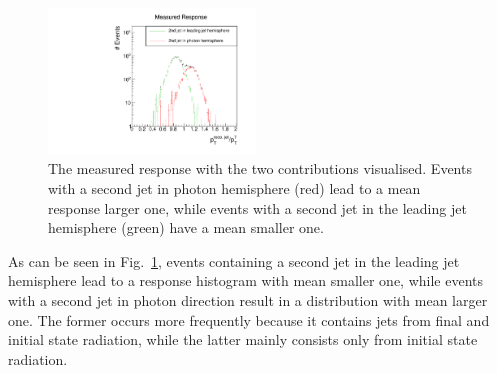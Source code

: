 \begin{figure}[!b]
  \centering
  \vspace{35pt}
      \includegraphics[width=0.49\textwidth]{figures/resolution/methodology/fullResponseAndContributionsExample.pdf}
  \caption{The measured response with the two contributions visualised. Events with a second jet in photon hemisphere (red) lead to a mean response larger one, while events with a
           second jet in the leading jet hemisphere (green) have a mean smaller one.}  
  \label{fig:fullResponseAndContributions}
\end{figure}

As can be seen in Fig.~\ref{fig:fullResponseAndContributions}, events containing a second jet in the leading jet hemisphere lead to a response histogram with mean smaller one, while events with a second jet in photon direction result in a distribution with mean larger one. 
The former occurs more frequently because it contains jets from final and initial state radiation, while the latter mainly consists only from initial state radiation.



